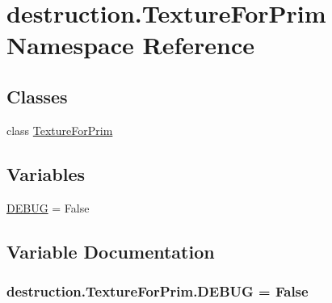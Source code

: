 \hypertarget{namespacedestruction_1_1_texture_for_prim}{\section{destruction.\-Texture\-For\-Prim Namespace Reference}
\label{namespacedestruction_1_1_texture_for_prim}
}
\subsection*{Classes}
\begin{DoxyCompactItemize}
\item 
class \hyperlink{classdestruction_1_1_texture_for_prim_1_1_texture_for_prim}{Texture\-For\-Prim}
\end{DoxyCompactItemize}
\subsection*{Variables}
\begin{DoxyCompactItemize}
\item 
\hyperlink{namespacedestruction_1_1_texture_for_prim_ae9c2b0992020494164275345fec70d5e}{D\-E\-B\-U\-G} = False
\end{DoxyCompactItemize}


\subsection{Variable Documentation}
\hypertarget{namespacedestruction_1_1_texture_for_prim_ae9c2b0992020494164275345fec70d5e}{
\subsubsection[{D\-E\-B\-U\-G}]{\setlength{\rightskip}{0pt plus 5cm}destruction.\-Texture\-For\-Prim.\-D\-E\-B\-U\-G = False}}\label{namespacedestruction_1_1_texture_for_prim_ae9c2b0992020494164275345fec70d5e}
